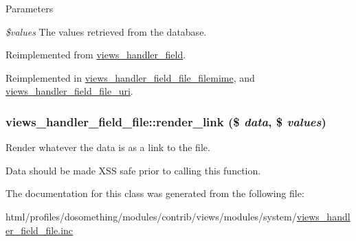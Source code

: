 \begin{DoxyParams}{Parameters}
\item[{\em \$values}]The values retrieved from the database. \end{DoxyParams}


Reimplemented from \hyperlink{classviews__handler__field_a82ff951c5e9ceb97b2eab86f880cbc1e}{views\_\-handler\_\-field}.

Reimplemented in \hyperlink{classviews__handler__field__file__filemime_aab7e80e82c714c09997290dc1b58088e}{views\_\-handler\_\-field\_\-file\_\-filemime}, and \hyperlink{classviews__handler__field__file__uri_af0c5416bd2f6c9c2e3cd1b73f7bf1c0f}{views\_\-handler\_\-field\_\-file\_\-uri}.\hypertarget{classviews__handler__field__file_a01e20dce2e91288a77521c1564754d03}{
\subsubsection[{render\_\-link}]{\setlength{\rightskip}{0pt plus 5cm}views\_\-handler\_\-field\_\-file::render\_\-link (\$ {\em data}, \/  \$ {\em values})}}
\label{classviews__handler__field__file_a01e20dce2e91288a77521c1564754d03}
Render whatever the data is as a link to the file.

Data should be made XSS safe prior to calling this function. 

The documentation for this class was generated from the following file:\begin{DoxyCompactItemize}
\item 
html/profiles/dosomething/modules/contrib/views/modules/system/\hyperlink{views__handler__field__file_8inc}{views\_\-handler\_\-field\_\-file.inc}\end{DoxyCompactItemize}

